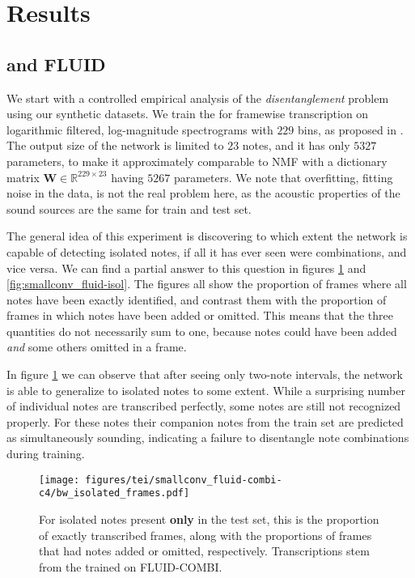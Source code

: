 \section{Results}
\subsection{\SmallConvNet and FLUID}
\label{sec:results_fluid}
We start with a controlled empirical analysis of the \textit{disentanglement} problem using our synthetic datasets. We train the \SmallConvNet for framewise transcription on logarithmic filtered, log-magnitude spectrograms with $229$ bins, as proposed in \cite{Kelz_Dorfer_Korzeniowski_Boeck_Arzt_Widmer_2016}. The output size of the network is limited to $23$ notes, and it has only $5327$ parameters, to make it approximately comparable to NMF with a dictionary matrix $\textbf{W} \in \mathbb{R}^{229 \times 23}$ having $5267$ parameters. We note that overfitting, fitting noise in the data, is not the real problem here, as the acoustic properties of the sound sources are the same for train and test set.

The general idea of this experiment is discovering to which extent the network is capable of detecting isolated notes, if all it has ever seen were combinations, and vice versa. We can find a partial answer to this question in figures \ref{fig:smallconv_fluid-combi} and \ref{fig:smallconv_fluid-isol}. The figures all show the proportion of frames where all notes have been exactly identified, and contrast them with the proportion of frames in which notes have been added or omitted. This means that the three quantities do not necessarily sum to one, because notes could have been added \textit{and} some others omitted in a frame.

In figure \ref{fig:smallconv_fluid-combi} we can observe that after seeing only \mbox{two-note} intervals, the network is able to generalize to isolated notes to some extent. While a surprising number of individual notes are transcribed perfectly, some notes are still not recognized properly. For these notes their companion notes from the train set are predicted as simultaneously sounding, indicating a failure to disentangle note combinations during training.

\begin{figure}[ht]
  \centering
  \texttt{[image: figures/tei/smallconv\_fluid-combi-c4/bw\_isolated\_frames.pdf]}
  \caption{For isolated notes present \textbf{only} in the test set, this is the proportion of exactly transcribed frames, along with the proportions of frames that had notes added or omitted, respectively. Transcriptions stem from the \SmallConvNet trained on FLUID-COMBI. \label{fig:smallconv_fluid-combi}}
\end{figure}


